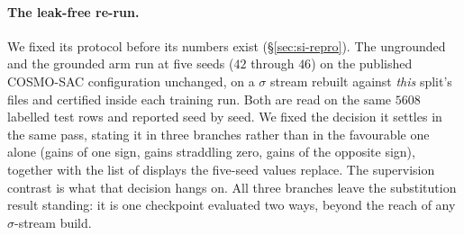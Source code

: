 \paragraph{The leak-free re-run.} We fixed its protocol before its numbers exist
(\S\ref{sec:si-repro}). The ungrounded and the grounded arm run at five seeds ($42$ through $46$) on
the published COSMO-SAC configuration unchanged, on a $\sigma$ stream rebuilt against \emph{this}
split's files and certified inside each training run. Both are read on the same $5608$ labelled test
rows and reported seed by seed. We fixed the decision it settles in the same pass, stating it in three
branches rather than in the favourable one alone (gains of one sign, gains straddling
zero, gains of the opposite sign), together with the list of displays the five-seed values replace.
The supervision contrast is what that decision hangs on. All three branches leave the
substitution result standing: it is one checkpoint evaluated two ways,
beyond the reach of any $\sigma$-stream build.

